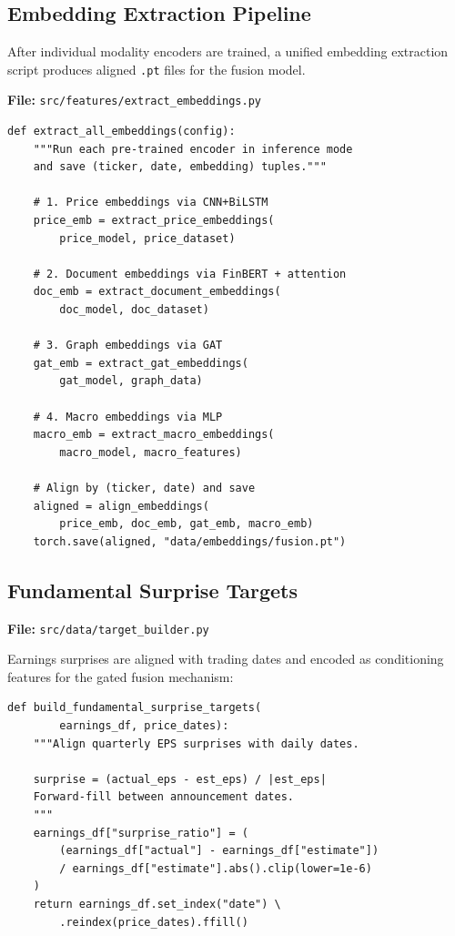 \documentclass[12pt, a4paper]{article}
\begin{document}
\subsection{Embedding Extraction Pipeline}
\label{sec:embeddings}

After individual modality encoders are trained, a unified embedding extraction script produces aligned \texttt{.pt} files for the fusion model.

\noindent\textbf{File:} \texttt{src/features/extract\_embeddings.py}

\begin{lstlisting}[caption={Embedding extraction overview}]
def extract_all_embeddings(config):
    """Run each pre-trained encoder in inference mode
    and save (ticker, date, embedding) tuples."""
    
    # 1. Price embeddings via CNN+BiLSTM
    price_emb = extract_price_embeddings(
        price_model, price_dataset)
    
    # 2. Document embeddings via FinBERT + attention
    doc_emb = extract_document_embeddings(
        doc_model, doc_dataset)
    
    # 3. Graph embeddings via GAT
    gat_emb = extract_gat_embeddings(
        gat_model, graph_data)
    
    # 4. Macro embeddings via MLP
    macro_emb = extract_macro_embeddings(
        macro_model, macro_features)
    
    # Align by (ticker, date) and save
    aligned = align_embeddings(
        price_emb, doc_emb, gat_emb, macro_emb)
    torch.save(aligned, "data/embeddings/fusion.pt")
\end{lstlisting}


\subsection{Fundamental Surprise Targets}

\noindent\textbf{File:} \texttt{src/data/target\_builder.py}

Earnings surprises are aligned with trading dates and encoded as conditioning features for the gated fusion mechanism:

\begin{lstlisting}[caption={Earnings surprise alignment}]
def build_fundamental_surprise_targets(
        earnings_df, price_dates):
    """Align quarterly EPS surprises with daily dates.

    surprise = (actual_eps - est_eps) / |est_eps|
    Forward-fill between announcement dates.
    """
    earnings_df["surprise_ratio"] = (
        (earnings_df["actual"] - earnings_df["estimate"])
        / earnings_df["estimate"].abs().clip(lower=1e-6)
    )
    return earnings_df.set_index("date") \
        .reindex(price_dates).ffill()
\end{lstlisting}
\end{document}
